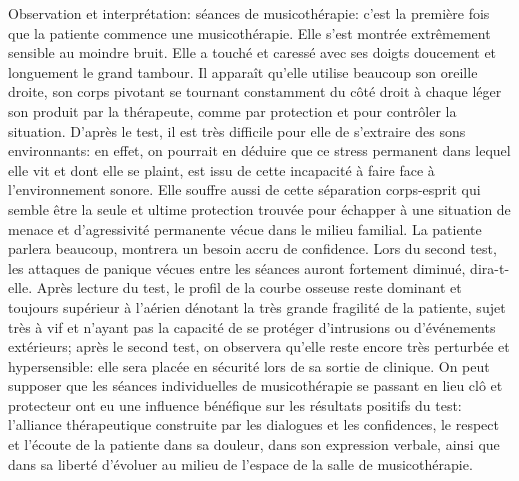             Observation et interprétation:  séances de musicothérapie: c'est la première fois que la patiente 
            commence une  musicothérapie.
            Elle s'est montrée extrêmement sensible au 
            moindre bruit.
            Elle a touché et caressé avec ses doigts doucement et longuement le grand tambour. 
            Il apparaît qu'elle utilise beaucoup son oreille droite, son corps pivotant  se tournant 
            constamment du 
            côté droit à chaque léger son produit par la thérapeute, comme par protection et  pour contrôler la 
            situation. 
            D'après le test, il est très difficile pour elle de s'extraire des sons environnants: en effet, on 
            pourrait en 
            déduire que ce stress permanent dans lequel elle vit et dont elle se plaint, est issu de cette 
            incapacité à 
            faire face à l'environnement sonore. Elle souffre aussi de cette séparation corps-esprit qui semble 
            être  
      la seule et ultime protection trouvée pour échapper à une situation  de menace  et d'agressivité 
      permanente vécue dans le milieu familial.
            La patiente parlera beaucoup, montrera un besoin accru de confidence. Lors du second test,  les 
            attaques de panique vécues entre les séances auront fortement 
            diminué, dira-t-elle. Après lecture du test, le profil de la courbe osseuse reste dominant et 
            toujours  
            supérieur à l'aérien dénotant la très grande fragilité de la patiente, 
            sujet très à vif et n'ayant pas la capacité de se protéger d'intrusions ou d'événements extérieurs; 
            après le second 
            test, on observera  qu'elle reste encore très 
            perturbée et hypersensible: elle sera placée en sécurité 
            lors de sa sortie de clinique. 
          On peut supposer que les séances individuelles de 
          musicothérapie se passant en lieu clô et protecteur ont eu une influence bénéfique sur  les 
          résultats positifs du test: %
           l'alliance thérapeutique construite par les dialogues et les 
            confidences,  le respect et l'écoute de la patiente dans sa douleur, dans son expression verbale, 
            ainsi 
            que dans sa liberté d'évoluer au milieu de l'espace de la salle de musicothérapie.
